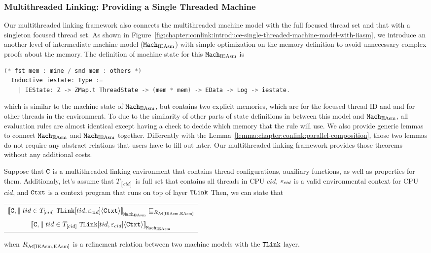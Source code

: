 \subsubsection{Multithreaded Linking: Providing a Single Threaded Machine}

Our multithreaded linking framework also connects the multithreaded machine model with the full focused thread set 
and that with a singleton focused thread set. 
As shown in Figure~\ref{fig:chapter:conlink:introduce-single-threaded-machine-model-with-iiasm},
we introduce an another level of intermediate machine model (${\mathrm{\texttt{Mach}}}_{\mathrm{IEAsm}}$) with
simple optimization on the memory definition to avoid unnecessary complex proofs about the memory. 
The definition of machine state for this ${\mathrm{\texttt{Mach}}}_{\mathrm{IEAsm}}$ is 
\begin{lstlisting}[language=C]
  (* fst mem : mine / snd mem : others *)
  Inductive iestate: Type :=
    | IEState: Z -> ZMap.t ThreadState -> (mem * mem) -> EData -> Log -> iestate.
\end{lstlisting}
which is similar to the machine state of ${\mathrm{\texttt{Mach}}}_{\mathrm{EAsm}}$, but 
contains two explicit memories, which are for the focused thread ID and 
and for other threads in the environment.
To due to the similarity of other parts of state definitions in between this model and ${\mathrm{\texttt{Mach}}}_{\mathrm{EAsm}}$, 
all evaluation rules are almost identical except having a check to decide which memory that the rule will use. 
We also provide generic lemmas to connect ${\mathrm{\texttt{Mach}}}_{\mathrm{EAsm}}$ and ${\mathrm{\texttt{Mach}}}_{\mathrm{IEAsm}}$ together. 
Differently with the Lemma~\ref{lemma:chapter:conlink:parallel-composition},
those two lemmas
do not require any abstract relations that
users have to fill out later. 
Our multithreaded linking framework provides those theorems without any additional costs. 

\begin{lemma}
\label{lemma:chapter:conlink:easm-refines-iieasm}
Suppose that ${{\mathrm{\texttt{C}}}}$ is a multithreaded linking environment that contains thread configurations, auxiliary functions, as well as properties for them. 
Additionaly, let's assume that  $T_{[cid]}$ is full set that contains all threads in CPU $cid$, 
 ${\varepsilon}_{cid}$ is a valid
environmental context for CPU $cid$,
and ${\mathrm{\texttt{Ctxt}}}$ is a
context program that runs on top of layer ${{\mathrm{\texttt{TLink}}}}$
 Then, we can state that
 \begin{center}
\begin{tabular}{c}
${[\![{{{\mathrm{\texttt{C}}}}, \parallel tid \in T_{[cid]} \  {{\mathrm{\texttt{TLink}}}}[tid, {\varepsilon}_{cid}]} \langle {{\mathrm{\texttt{Ctxt}}}} \rangle]\!]}_{{\mathrm{\texttt{Mach}}}_{\mathrm{EAsm}}} \sqsubseteq_{R_{\mathcal{M}{[\mathrm{IEAsm}, \mathrm{EAsm}]}}}$\\ 
${[\![{{{\mathrm{\texttt{C}}}}, \parallel tid \in T_{[cid]} \  {{\mathrm{\texttt{TLink}}}}[tid, {\varepsilon}_{cid}]} \langle {{\mathrm{\texttt{Ctxt}}}} \rangle]\!]}_{{\mathrm{\texttt{Mach}}}_{\mathrm{IEAsm}}}$\\
\end{tabular}
\end{center}
when $R_{\mathcal{M}{[\mathrm{IEAsm}, \mathrm{EAsm}]}}$ is a refinement relation between two machine models with the ${{\mathrm{\texttt{TLink}}}}$ layer.
\end{lemma}


